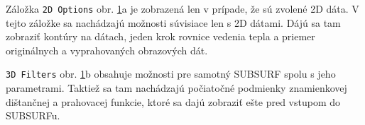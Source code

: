 \documentclass[a4paper,11pt,oneside]{article}%
\begin{document}
Záložka \texttt{2D Options} obr. \ref{fig:uidata1}a je zobrazená len v prípade, že sú zvolené 2D dáta. V tejto záložke sa nachádzajú možnosti súvisiace len s 2D dátami. Dájú sa tam zobraziť kontúry na dátach,  jeden krok rovnice vedenia tepla a priemer originálnych a vyprahovaných obrazových dát. 

\texttt{3D Filters} obr. \ref{fig:uidata1}b obsahuje možnosti pre samotný SUBSURF spolu s jeho parametrami. Taktiež sa tam nachádzajú počiatočné podmienky znamienkovej dištančnej a prahovacej funkcie, ktoré sa dajú zobraziť ešte pred vstupom do SUBSURFu.


\begin{figure}[H]%
    \centering
    \qquad
    \caption{}%
    \label{fig:uidata1}%
\end{figure}
\end{document}
